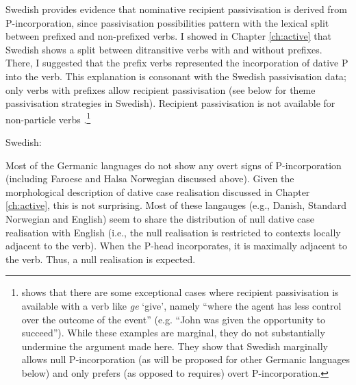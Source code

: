 Swedish provides evidence that nominative recipient passivisation is derived from P-incorporation, since passivisation possibilities pattern with the lexical split between prefixed and non-prefixed verbs. I showed in Chapter \ref{ch:active} that Swedish shows a split between ditransitive verbs with and without prefixes. There, I suggested that the prefix verbs represented the incorporation of dative P into the verb. This explanation is consonant with the Swedish passivisation data; only verbs with prefixes allow recipient passivisation (see below for theme passivisation strategies in Swedish). Recipient passivisation is not available for non-particle verbs \citep{Lundquist.2006}.\footnote{\cite{Lundquist.2004} shows that there are some exceptional cases where recipient passivisation is available with a verb like \textit{ge} `give', namely ``where the agent has less control over the outcome of the event'' (e.g. ``John was given the opportunity to succeed''). While these examples are marginal, they do not substantially undermine the argument made here. They show that Swedish marginally allows null P-incorporation (as will be proposed for other Germanic languages below) and only prefers (as opposed to requires) overt P-incorporation.} 

\begin{exe}
	\ex Swedish:\label{ex:swe-part}
	\begin{xlist}
\end{xlist}	
\end{exe}


Most of the Germanic languages do not show any overt signs of P-incorporation (including Faroese and Halsa Norwegian discussed above). Given the morphological description of dative case realisation discussed in Chapter \ref{ch:active}, this is not surprising. Most of these langauges (e.g., Danish, Standard Norwegian and English) seem to share the distribution of null dative case realisation with English (i.e., the null realisation is restricted to contexts locally adjacent to the verb). When the P-head incorporates, it is maximally adjacent to the verb. Thus, a null realisation is expected.

